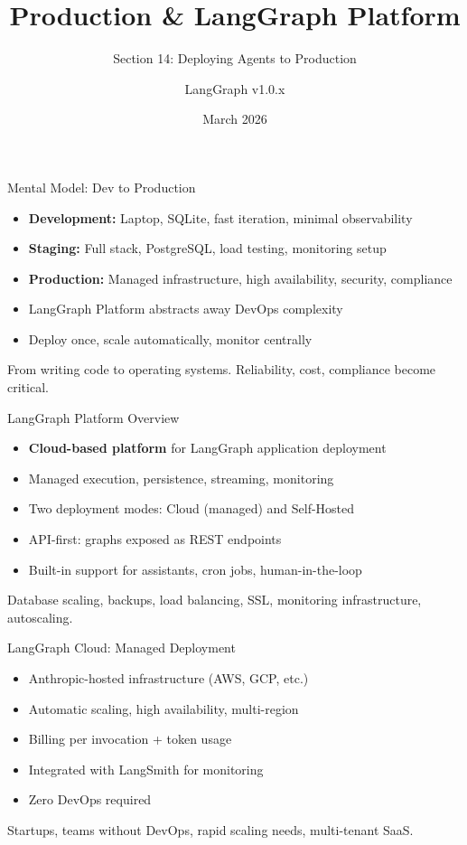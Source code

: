 \documentclass[aspectratio=169,11pt]{beamer}
\title{Production \& LangGraph Platform}
\subtitle{Section 14: Deploying Agents to Production}
\author{LangGraph v1.0.x}
\date{March 2026}
\begin{document}
\frame{\titlepage}

\begin{frame}{Mental Model: Dev to Production}
\setlength{\itemsep}{1pt}
\begin{itemize}
\item \textbf{Development:} Laptop, SQLite, fast iteration, minimal observability
\item \textbf{Staging:} Full stack, PostgreSQL, load testing, monitoring setup
\item \textbf{Production:} Managed infrastructure, high availability, security, compliance
\item LangGraph Platform abstracts away DevOps complexity
\item Deploy once, scale automatically, monitor centrally
\end{itemize}
\vspace{0.15cm}
\begin{conceptbox}
From writing code to operating systems. Reliability, cost, compliance become critical.
\end{conceptbox}
\end{frame}

\begin{frame}{LangGraph Platform Overview}
\setlength{\itemsep}{1pt}
\begin{itemize}
\item \textbf{Cloud-based platform} for LangGraph application deployment
\item Managed execution, persistence, streaming, monitoring
\item Two deployment modes: Cloud (managed) and Self-Hosted
\item API-first: graphs exposed as REST endpoints
\item Built-in support for assistants, cron jobs, human-in-the-loop
\end{itemize}
\vspace{0.15cm}
\begin{tipbox}
Database scaling, backups, load balancing, SSL, monitoring infrastructure, autoscaling.
\end{tipbox}
\end{frame}

\begin{frame}{LangGraph Cloud: Managed Deployment}
\setlength{\itemsep}{1pt}
\begin{itemize}
\item Anthropic-hosted infrastructure (AWS, GCP, etc.)
\item Automatic scaling, high availability, multi-region
\item Billing per invocation + token usage
\item Integrated with LangSmith for monitoring
\item Zero DevOps required
\end{itemize}
\vspace{0.15cm}
\begin{tipbox}
Startups, teams without DevOps, rapid scaling needs, multi-tenant SaaS.
\end{tipbox}
\end{frame}
\end{document}
